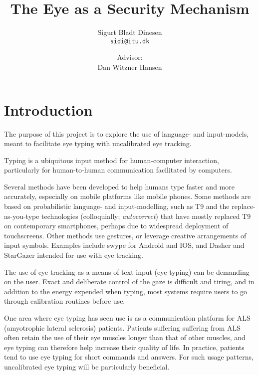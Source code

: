\documentclass[a4paper, titlepage]{article}
\renewcommand{\%}{\scalebox{.9}{\oldpct}}
\begin{document}
\title{The Eye as a Security Mechanism}
\author{
	Sigurt Bladt Dinesen
	\\\texttt{sidi@itu.dk}
	\and
	Advisor:
	\\Dan Witzner Hansen
}


\maketitle
\tableofcontents
\clearpage
\section{Introduction}
The purpose of this project is to explore the use of language- and
input-models, meant to facilitate eye typing with uncalibrated eye tracking.

Typing is a ubiquitous input method for human-computer interaction, particularly for human-to-human communication facilitated by computers.

Several methods have been developed to help humans type faster and more
accurately, especially on mobile platforms like mobile phones. Some
methods are based on probabilistic language- and input-modelling, such
as T9 and the replace-as-you-type technologies (colloquially;
\emph{autocorrect}) that have mostly replaced T9 on contemporary
smartphones, perhaps due to widespread deployment of touchscreens. Other
methods use gestures, or leverage creative arrangements of input
symbols. Examples include swype for Android and IOS, and Dasher and
StarGazer intended for use with eye tracking.

The use of eye tracking as a means of text input (eye typing) can be
demanding on the user. Exact and deliberate control of the gaze is
difficult and tiring, and in addition to the energy expended when
typing, most systems require users to go through calibration routines
before use.

One area where eye typing has seen use is as a communication platform
for ALS (amyotrophic lateral sclerosis) patients. Patients suffering
suffering from ALS often retain the use of their eye muscles longer than
that of other muscles, and eye typing can therefore help increase their
quality of life. In practice, patients tend to use eye typing
for short commands and answers. For such usage patterns, uncalibrated
eye typing will be particularly beneficial.
\end{document}

